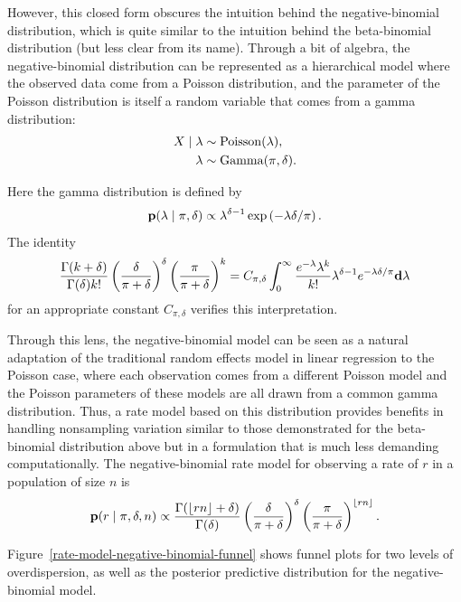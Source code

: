 However, this closed form obscures the intuition behind the
negative-binomial distribution, which is quite similar to the
intuition behind the beta-binomial distribution (but less clear from
its name). Through a bit of algebra, the negative-binomial
distribution can be represented as a hierarchical model where the
observed data come from a Poisson distribution, and the parameter of
the Poisson distribution is itself a random variable that comes from a
gamma distribution:
\begin{align*}
X\;|\; \lambda &\sim \operatorname{Poisson}(\lambda),\\
\lambda &\sim \operatorname{Gamma}(\pi, \delta).
\end{align*}

Here the gamma distribution is defined by
\[
\mathbf{p}(\lambda \;|\; \pi, \delta) \propto \lambda^{\delta-1} \exp\left(-\lambda \delta/\pi \right).
\]
The identity
\[
\frac{\Gamma(k+\delta)}{\Gamma(\delta)k!} \left(\frac{\delta}{\pi+\delta}\right)^\delta \left(\frac{\pi}{\pi+\delta}\right)^k
=
 C_{\pi, \delta} \int_0^\infty \frac{e^{-\lambda}\lambda^k}{k!} \lambda^{\delta-1} e^{-\lambda \delta/\pi} \mathbf{d} \lambda
\]
for an appropriate constant $C_{\pi,\delta}$ verifies this interpretation.

Through this lens, the negative-binomial model can be seen as a
natural adaptation of the traditional random effects model in linear
regression to the Poisson case, where each observation comes from a
different Poisson model and the Poisson parameters of these models are
all drawn from a common gamma distribution. Thus, a rate model based on
this distribution provides benefits in handling nonsampling variation
similar to those demonstrated for the beta-binomial distribution
above but in a formulation that is much less demanding
computationally.  The negative-binomial rate model for observing a
rate of $r$ in a population of size $n$ is
\[
\mathbf{p}(r\;|\; \pi, \delta, n) \propto
 \frac{\Gamma(\lfloor rn \rfloor+\delta)}{\Gamma(\delta)}
 \left(\frac{\delta}{\pi+\delta}\right)^\delta \left(\frac{\pi}{\pi+\delta}\right)^{\lfloor rn\rfloor}.
\]

Figure~\ref{rate-model-negative-binomial-funnel} shows funnel plots
for two levels of overdispersion, as well as the posterior predictive
distribution for the negative-binomial model.

